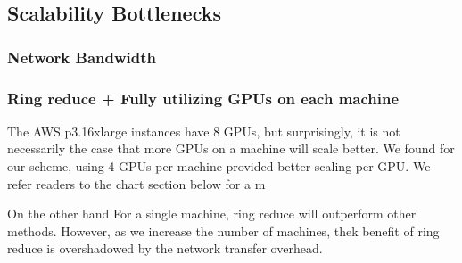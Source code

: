 \subsection{Scalability Bottlenecks}
\subsubsection{Network Bandwidth}


\subsubsection{Ring reduce + Fully utilizing GPUs on each machine}
The AWS p3.16xlarge instances have 8 GPUs, but surprisingly, it is not necessarily the case that more GPUs on a machine will scale better. We found for our scheme, using 4 GPUs per machine provided better scaling per GPU. We refer readers to the chart section below for a m

On the other hand For a single machine, ring reduce will outperform other methods. However, as we increase the number of machines, thek benefit of ring reduce is overshadowed by the network transfer overhead.
